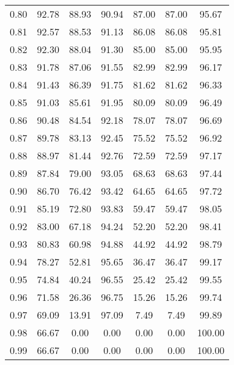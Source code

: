 \begin{tabular}{|c|c|c|c|c|c|c|}
      0.80 &     92.78 &     88.93 &      90.94 &   87.00 &      87.00 &         95.67 \\
      0.81 &     92.57 &     88.53 &      91.13 &   86.08 &      86.08 &         95.81 \\
      0.82 &     92.30 &     88.04 &      91.30 &   85.00 &      85.00 &         95.95 \\
      0.83 &     91.78 &     87.06 &      91.55 &   82.99 &      82.99 &         96.17 \\
      0.84 &     91.43 &     86.39 &      91.75 &   81.62 &      81.62 &         96.33 \\
      0.85 &     91.03 &     85.61 &      91.95 &   80.09 &      80.09 &         96.49 \\
      0.86 &     90.48 &     84.54 &      92.18 &   78.07 &      78.07 &         96.69 \\
      0.87 &     89.78 &     83.13 &      92.45 &   75.52 &      75.52 &         96.92 \\
      0.88 &     88.97 &     81.44 &      92.76 &   72.59 &      72.59 &         97.17 \\
      0.89 &     87.84 &     79.00 &      93.05 &   68.63 &      68.63 &         97.44 \\
      0.90 &     86.70 &     76.42 &      93.42 &   64.65 &      64.65 &         97.72 \\
      0.91 &     85.19 &     72.80 &      93.83 &   59.47 &      59.47 &         98.05 \\
      0.92 &     83.00 &     67.18 &      94.24 &   52.20 &      52.20 &         98.41 \\
      0.93 &     80.83 &     60.98 &      94.88 &   44.92 &      44.92 &         98.79 \\
      0.94 &     78.27 &     52.81 &      95.65 &   36.47 &      36.47 &         99.17 \\
      0.95 &     74.84 &     40.24 &      96.55 &   25.42 &      25.42 &         99.55 \\
      0.96 &     71.58 &     26.36 &      96.75 &   15.26 &      15.26 &         99.74 \\
      0.97 &     69.09 &     13.91 &      97.09 &    7.49 &       7.49 &         99.89 \\
      0.98 &     66.67 &      0.00 &       0.00 &    0.00 &       0.00 &        100.00 \\
      0.99 &     66.67 &      0.00 &       0.00 &    0.00 &       0.00 &        100.00 \\
\bottomrule
\end{tabular}
